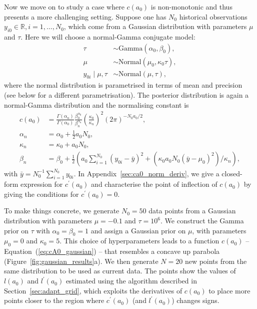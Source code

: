 \documentclass[a4paper, notitlepage, 11pt]{article}
\begin{document}
Now we move on to study a case where $c(a_0)$ is non-monotonic and thus presents a more challenging setting.
Suppose one has $N_0$ historical observations $y_{i0} \in \mathbb{R}, i = 1, \ldots, N_0$, which come from a Gaussian distribution with parameters $\mu$ and $\tau$.
Here we will choose a normal-Gamma conjugate model:
\begin{align*}
 \tau &\sim \text{Gamma}(\alpha_0, \beta_0),\\
 \mu &\sim \text{Normal}(\mu_0, \kappa_0\tau ),\\
 y_{0i} \mid \mu, \tau &\sim \text{Normal}(\mu, \tau),
\end{align*}
where the normal distribution is parametrised in terms of mean and precision (see below for a different parametrisation).
The posterior distribution is again a normal-Gamma distribution and the normalising constant is
\begin{align}
 \label{eq:cA0_gaussian}
 c(a_0) &= \frac{\Gamma(\alpha_n)}{\Gamma(\alpha_0)}\frac{\beta_0^{\alpha_0}}{\beta_n^{\alpha_n}} \left(\frac{\kappa_0}{\kappa_n} \right)^2 (2\pi)^{-N_0 a_0/2},\\
 \nonumber
 \alpha_n &= \alpha_0 + \frac{1}{2}a_0N_0, \\
 \nonumber
 \kappa_n &= \kappa_0 + a_0N_0, \\
 \nonumber
 \beta_n  &= \beta_0 + \frac{1}{2}\left( a_0\sum_{i=1}^{N_0}(y_{0i}-\bar{y})^2 + \left(\kappa_0 a_0 N_0 (\bar{y}-\mu_0)^2\right)/\kappa_n \right),
\end{align}
with $\bar{y} = N_0^{-1}\sum_{i=1}^{N_0} y_{0i}$.
In Appendix~\ref{sec:ca0_norm_deriv}, we give a closed-form expression for $c^\prime(a_0)$ and characterise the point of inflection of $c(a_0)$ by giving the conditions for $c^\prime(a_0) = 0$.

To make things concrete, we generate $N_0 = 50$ data points from a Gaussian distribution with parameters $\mu = -0.1$ and  $\tau = 10^{6}$.
We construct the Gamma prior on $\tau$ with $\alpha_0 = \beta_0 = 1$ and assign a Gaussian prior on $\mu$, with parameters $\mu_0 = 0$ and $\kappa_0 = 5$.
This
choice of hyperparameters leads to a function $c(a_0)$ -- Equation~(\ref{eq:cA0_gaussian}) -- that resembles a concave up parabola (Figure~\ref{fig:gaussian_results}a). 
We then generate $N =20$ new points from the same distribution to be used as current data.
The points show the values of $l(a_0)$ and $l^\prime(a_0)$ estimated using the algorithm described in Section~\ref{sec:adapt_grid}, which exploits the derivatives of $c(a_0)$ to place more points closer to the region where $c^\prime(a_0)$ (and $l^\prime(a_0)$) changes signs.
\end{document}
